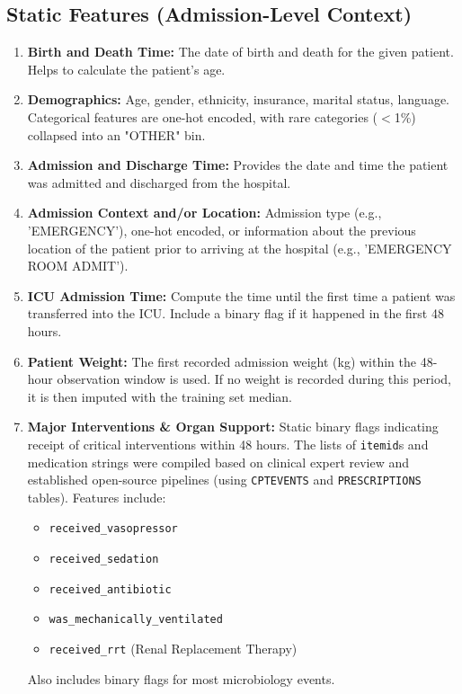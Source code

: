 \documentclass[11pt, a4paper]{article}
\begin{document}
\subsection{Static Features (Admission-Level Context)}
\begin{enumerate}
    \item \textbf{Birth and Death Time:} The date of birth and death for the given patient. Helps to calculate the patient's age.
    \item \textbf{Demographics:} Age, gender, ethnicity, insurance, marital status, language. Categorical features are one-hot encoded, with rare categories ($<$1\%) collapsed into an "OTHER" bin.
    \item \textbf{Admission and Discharge Time:} Provides the date and time the patient was admitted and discharged from the hospital.
    \item \textbf{Admission Context and/or Location:} Admission type (e.g., 'EMERGENCY'), one-hot encoded, or information about the previous location of the patient prior to arriving at the hospital (e.g., 'EMERGENCY ROOM ADMIT').
    \item \textbf{ICU Admission Time:} Compute the time until the first time a patient was transferred into the ICU. Include a binary flag if it happened in the first 48 hours.
    \item \textbf{Patient Weight:} The first recorded admission weight (kg) within the 48-hour observation window is used. If no weight is recorded during this period, it is then imputed with the training set median.
    \item \textbf{Major Interventions \& Organ Support:} Static binary flags indicating receipt of critical interventions within 48 hours. The lists of \texttt{itemid}s and medication strings were compiled based on clinical expert review and established open-source pipelines (using \texttt{CPTEVENTS} and \texttt{PRESCRIPTIONS} tables).
    Features include:
    \begin{itemize}
        \item \texttt{received\_vasopressor}
        \item \texttt{received\_sedation}
        \item \texttt{received\_antibiotic}
        \item \texttt{was\_mechanically\_ventilated}
        \item \texttt{received\_rrt} (Renal Replacement Therapy)
    \end{itemize}
    Also includes binary flags for most microbiology events.
\end{enumerate}
\end{document}
